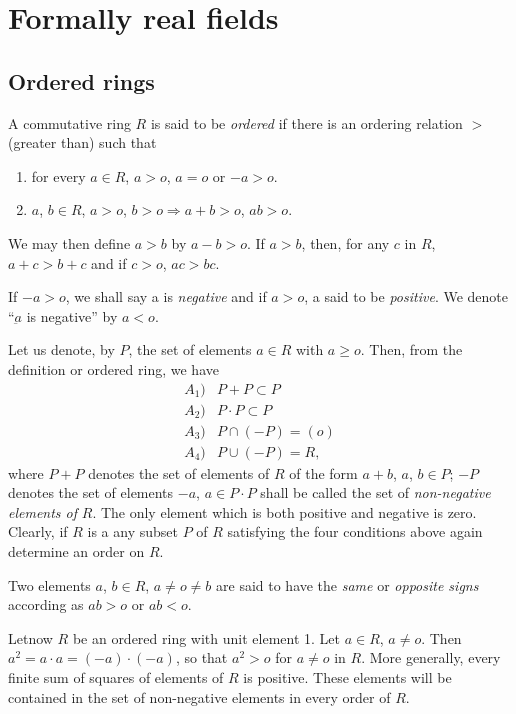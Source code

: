 \chapter{Formally real fields}\label{chap7} %

\section{Ordered rings}\label{c7:s1}\pageoriginale %

A commutative ring $R$ is said to be \textit{ordered} if there is an
ordering relation  $>$ (greater than) such that  
\begin{enumerate}
\renewcommand{\labelenumi}{(1)}
\item for every $a \in R$, $a >o$, $a=o$ or $-a >o$.

\item $a$, $b \in R$, $a> o$, $b >o \Rightarrow a+b >o$, $ab >o$.
\end{enumerate}

We may then define $a > b$ by $a-b>o$. If $a>b$, then, for any $c$ in
$R$, $a+c> b+c$ and if $c >o$, $ac> bc$. 

If $- a> o$, we shall say a is \textit{negative} and if $a > o$, a
said to be \textit{positive}. We denote ``$\underbar{a}$ is negative''
 by $a < o$. 
 
Let us denote, by $P$, the set of elements $a \in R$ with $a \ge
o$. Then, from the definition or ordered ring, we have 
\begin{align*}
A_1) & P+ P \subset P\\
A_2) & P \cdot   P \subset P\\
A_3) & P \cap (-P) = (o)\\
A_4) & P \cup (-P) = R,
\end{align*}
where $P+P$ denotes the set of elements of $R$ of the form $a+b$, $a$,
$b \in P$; $-P$ denotes the set of elements $-a$, $a \in P \cdot  P$
shall be called the set of \textit{non-negative elements of} $R$. The
only element which is both positive and negative  is zero. Clearly, if
$R$ is a any subset $P$ of $R$ satisfying the four conditions above
again determine an order  on $R$.  

Two elements $a$, $b \in R$, $a \neq o \neq b$ are said to have the
\textit{same} or \textit{opposite signs} according as $ab >o$ or $ab <
o$. 

Let\pageoriginale now $R$ be an ordered ring  with unit element 1. Let
$a \in R$, 
$a \neq o$. Then  $a^2= a  \cdot a=  (-a) \cdot (-a)$, so that $a^2>
o$ for $a \neq o$ in $R$. More generally, every finite sum of squares
of elements of $R$ is positive. These elements will be contained in
the set of non-negative elements in every order of $R$.  

